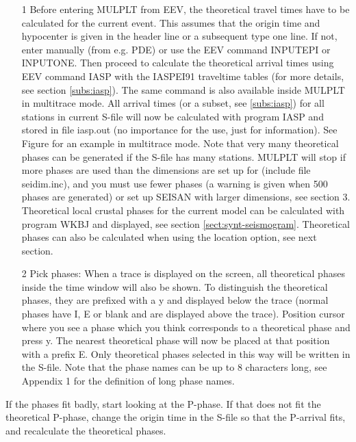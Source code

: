 \begin{itemize}
\item[1]
 Before entering MULPLT from EEV, the theoretical travel times have to be calculated for the current event. This assumes that the origin time and hypocenter is given in the header line or a subsequent type one line. If not, enter manually (from e.g. PDE) or use the EEV command INPUTEPI or INPUTONE. Then proceed to calculate the theoretical arrival times using EEV command IASP with the IASPEI91 traveltime tables (for more details, see section \ref{subs:iasp}). The same command is also available inside MULPLT in multitrace mode. All arrival times (or a subset, see \ref{subs:iasp}) for all stations in current S-file will now be calculated with program IASP and stored in file iasp.out (no importance for the use, just for information). See Figure 
\label{fig:mulplt-multitrace}
for an example in multitrace mode. Note that very many theoretical phases can be generated if the S-file has many stations. MULPLT will stop if more phases are used than the dimensions are set up for (include file seidim.inc), and you must use fewer phases (a warning is given when 500 phases are generated) or set up SEISAN with larger dimensions, see section 3. Theoretical local crustal phases for the current model can  be calculated with program WKBJ and displayed, see section \ref{sect:synt-seismogram}. Theoretical phases can also be calculated when using the location option, see next section. 

\item[2]
 Pick phases: When a trace is displayed on the screen, all theoretical phases inside the time window will also be shown. To distinguish the theoretical phases, they are prefixed with a y and displayed below the trace (normal phases have I, E or blank and are displayed above the trace). Position cursor where you see a phase which you think corresponds to a theoretical phase and press y. The nearest theoretical phase will now be placed at that position with a prefix E. Only theoretical phases selected in this way will be written in the S-file. Note that the phase names can be up to 8 characters long, see Appendix 1 for the definition of long phase names. 
\end{itemize}

If the phases fit badly, start looking at the P-phase. If that does not fit the theoretical P-phase, change the origin time in the S-file so that the P-arrival fits, and recalculate the theoretical phases.  

